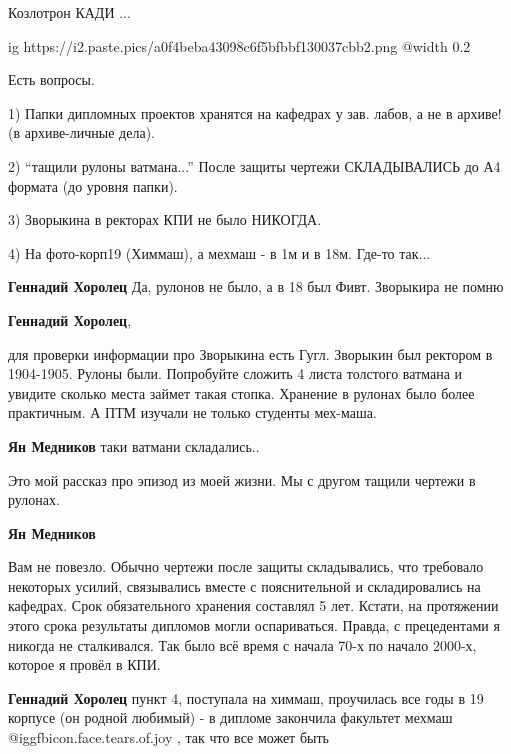 \begin{itemize}
Козлотрон КАДИ ...


\ifcmt
  ig https://i2.paste.pics/a0f4beba43098c6f5bfbbf130037cbb2.png
  @width 0.2
\fi


Есть вопросы.

1) Папки дипломных проектов хранятся на кафедрах у зав. лабов, а не в архиве! (в архиве-личные дела).

2) \enquote{тащили рулоны ватмана...} После защиты чертежи СКЛАДЫВАЛИСЬ до А4 формата (до уровня папки).

3) Зворыкина в ректорах КПИ не было НИКОГДА.

4) На фото-корп19 (Химмаш), а мехмаш - в 1м и в 18м. Где-то так...

\begin{itemize} %
\textbf{Геннадий Хоролец} Да, рулонов не было, а в 18 был Фивт. Зворыкира не помню

\textbf{Геннадий Хоролец}, 

для проверки информации про Зворыкина есть Гугл. Зворыкин был ректором в
1904-1905. Рулоны были. Попробуйте сложить 4 листа толстого ватмана и увидите
сколько места займет такая стопка. Хранение в рулонах было более практичным. А
ПТМ изучали не только студенты мех-маша.

\begin{itemize} %
\textbf{Ян Медников} таки ватмани складались..


Это мой рассказ про эпизод из моей жизни. Мы с другом тащили чертежи в рулонах.


\textbf{Ян Медников}

Вам не повезло. Обычно чертежи после защиты складывались, что требовало
некоторых усилий, связывались вместе с пояснительной и складировались на
кафедрах. Срок обязательного хранения составлял 5 лет. Кстати, на протяжении
этого срока результаты дипломов могли оспариваться. Правда, с прецедентами я
никогда не сталкивался. Так было всё время с начала 70-х по начало 2000-х,
которое я провёл в КПИ.

\end{itemize} %

\textbf{Геннадий Хоролец} пункт 4, поступала на химмаш, проучилась все годы в 19 корпусе
(он родной любимый) - в дипломе закончила факультет мехмаш @igg{fbicon.face.tears.of.joy} , так что все может
быть


\end{itemize}
\end{itemize}
